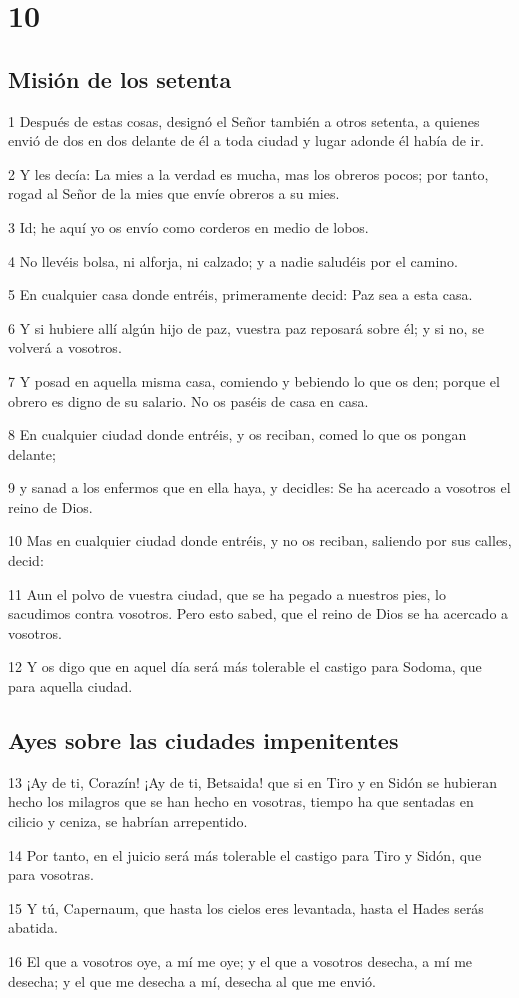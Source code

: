 \chapter{10}

\section*{Misión de los setenta}

\par 1 Después de estas cosas, designó el Señor también a otros setenta, a quienes envió de dos en dos delante de él a toda ciudad y lugar adonde él había de ir.
\par 2 Y les decía: La mies a la verdad es mucha, mas los obreros pocos; por tanto, rogad al Señor de la mies que envíe obreros a su mies.
\par 3 Id; he aquí yo os envío como corderos en medio de lobos.
\par 4 No llevéis bolsa, ni alforja, ni calzado; y a nadie saludéis por el camino.
\par 5 En cualquier casa donde entréis, primeramente decid: Paz sea a esta casa.
\par 6 Y si hubiere allí algún hijo de paz, vuestra paz reposará sobre él; y si no, se volverá a vosotros.
\par 7 Y posad en aquella misma casa, comiendo y bebiendo lo que os den; porque el obrero es digno de su salario. No os paséis de casa en casa.
\par 8 En cualquier ciudad donde entréis, y os reciban, comed lo que os pongan delante;
\par 9 y sanad a los enfermos que en ella haya, y decidles: Se ha acercado a vosotros el reino de Dios.
\par 10 Mas en cualquier ciudad donde entréis, y no os reciban, saliendo por sus calles, decid:
\par 11 Aun el polvo de vuestra ciudad, que se ha pegado a nuestros pies, lo sacudimos contra vosotros. Pero esto sabed, que el reino de Dios se ha acercado a vosotros.
\par 12 Y os digo que en aquel día será más tolerable el castigo para Sodoma, que para aquella ciudad.

\section*{Ayes sobre las ciudades impenitentes}

\par 13 ¡Ay de ti, Corazín! ¡Ay de ti, Betsaida! que si en Tiro y en Sidón se hubieran hecho los milagros que se han hecho en vosotras, tiempo ha que sentadas en cilicio y ceniza, se habrían arrepentido.
\par 14 Por tanto, en el juicio será más tolerable el castigo para Tiro y Sidón, que para vosotras.
\par 15 Y tú, Capernaum, que hasta los cielos eres levantada, hasta el Hades serás abatida.
\par 16 El que a vosotros oye, a mí me oye; y el que a vosotros desecha, a mí me desecha; y el que me desecha a mí, desecha al que me envió.

